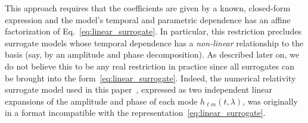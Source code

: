 \documentclass[aps,prd,nofootinbib,showpacs,amssymb,twocolumn]{revtex4}
\begin{document}
This approach requires that
the coefficients are given by a known, closed-form expression 
and the model's temporal and parametric dependence has an affine factorization of Eq.~\eqref{eq:linear_surrogate}. 
In particular, this restriction precludes surrogate models whose temporal dependence has
a {\em non-linear} relationship to the basis (say, by an amplitude and phase decomposition). As described later on, 
we do not believe this to be any real restriction in practice since all surrogates can be brought into the form~\eqref{eq:linear_surrogate}. Indeed, the numerical relativity surrogate model used in this paper~\cite{gwastro-approx-ROMNR-Blackman2015}, expressed as two independent linear expansions of the amplitude and
phase of each mode $h_{\ell m}(t,\lambda) $, was originally in a format incompatible with the representation~\eqref{eq:linear_surrogate}.

%
\end{document}

